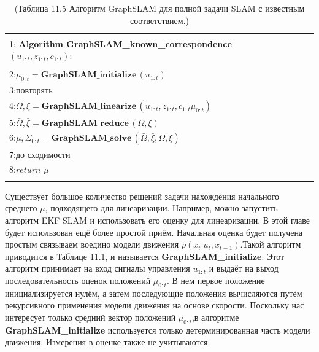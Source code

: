 \documentclass[10pt,a4paper]{article}
\begin{document}
\begin{table}[H]
\begin{center}
\begin{tabular}{|l|}
\hline
{}\\
1: \textbf{Algorithm GraphSLAM\_known\_correspondence}$(u_{1:t},z_{1:t},c_{1:t}):\qquad$ \\
{}\\
2:\hspace{5mm}$\mu_{0:t}=\textbf{GraphSLAM\_initialize}\,(u_{1:t})$\\
3:\hspace{5mm}$\textit{повторять}$\\
4:\hspace{10mm}$\varOmega,\xi=\textbf{GraphSLAM\_linearize}\,(u_{1:t},z_{1:t},c_{1:t}\mu_{0:t})$\\
5:\hspace{10mm}$\bar{\varOmega},\bar{\xi}=\textbf{GraphSLAM\_reduce}\,(\varOmega,\xi)$\\
6:\hspace{10mm}$\mu,\varSigma_{0:t}=\textbf{GraphSLAM\_solve}\,(\bar{\varOmega},\bar{\xi},\varOmega,\xi)$\\
7:\hspace{5mm}$\textit{до сходимости}$\\
8:\hspace{5mm}$\textit{return}\,\,\mu$\\
{}\\
\hline
\end{tabular}
\caption{(Таблица 11.5 Алгоритм GraphSLAM для полной задачи SLAM с известным соответствием.)}
\end{center}
\end{table}

Существует большое количество решений задачи нахождения начального среднего $\mu$, подходящего для линеаризации. Например, можно запустить алгоритм EKF SLAM и использовать его оценку для линеаризации. В этой главе будет использован ещё более простой приём. Начальная оценка будет получена простым связываем воедино модели движения $p(x_t|u_t,x_{t-1})$.Такой алгоритм приводится в Таблице 11.1, и называется \textbf{GraphSLAM\_initialize}. Этот алгоритм принимает на вход сигналы управления $u_{1:t}$ и выдаёт на выход последовательность оценок положений $\mu_{0:t}$. В нем первое положение инициализируется нулём, а затем последующие положения вычисляются путём рекурсивного применения модели движения на основе скорости. Поскольку нас интересует только средний вектор положений $\mu_{0:t}$,в алгоритме \textbf{GraphSLAM\_initialize} используется только детерминированная часть модели движения. Измерения в оценке также не учитываются.
\end{document}
